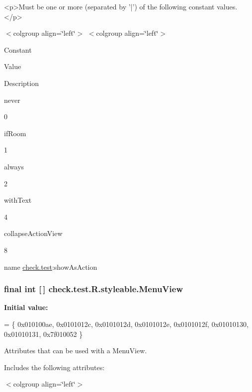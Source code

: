 \begin{DoxyVerb}      <p>Must be one or more (separated by '|') of the following constant values.</p>
\end{DoxyVerb}
 \begin{TabularC}{0}
\hline
\end{TabularC}
$<$colgroup align=\char`\"{}left\char`\"{}$>$ $<$colgroup align=\char`\"{}left\char`\"{}$>$ 

Constant

Value

Description 

{\ttfamily never}

0

{\ttfamily if\+Room}

1

{\ttfamily always}

2

{\ttfamily with\+Text}

4

{\ttfamily collapse\+Action\+View}

8

name \hyperlink{namespacecheck_1_1test}{check.\+test}\+:show\+As\+Action \hypertarget{classcheck_1_1test_1_1_r_1_1styleable_acb1b5275ffcfc132a3221b157fed1ff8}{}
\subsubsection[{Menu\+View}]{\setlength{\rightskip}{0pt plus 5cm}final int \mbox{[}$\,$\mbox{]} check.\+test.\+R.\+styleable.\+Menu\+View\hspace{0.3cm}{\ttfamily [static]}}\label{classcheck_1_1test_1_1_r_1_1styleable_acb1b5275ffcfc132a3221b157fed1ff8}
{\bfseries Initial value\+:}
\begin{DoxyCode}
= \{
            0x010100ae, 0x0101012c, 0x0101012d, 0x0101012e,
            0x0101012f, 0x01010130, 0x01010131, 0x7f010052
        \}
\end{DoxyCode}
Attributes that can be used with a Menu\+View. 

Includes the following attributes\+:

\begin{TabularC}{0}
\hline
\end{TabularC}
$<$colgroup align=\char`\"{}left\char`\"{}$>$ 

